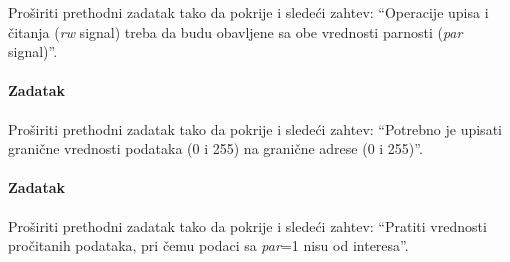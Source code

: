 Proširiti prethodni zadatak tako da pokrije i sledeći zahtev: ``Operacije upisa
i čitanja (\emph{rw} signal) treba da budu obavljene sa obe vrednosti parnosti
(\emph{par} signal)''.

\paragraph{Zadatak}

Proširiti prethodni zadatak tako da pokrije i sledeći zahtev: ``Potrebno je
upisati granične vrednosti podataka (0 i 255) na granične adrese (0 i 255)''.

\paragraph{Zadatak}

Proširiti prethodni zadatak tako da pokrije i sledeći zahtev: ``Pratiti
vrednosti pročitanih podataka, pri čemu podaci sa \emph{par}=1 nisu od
interesa''.


